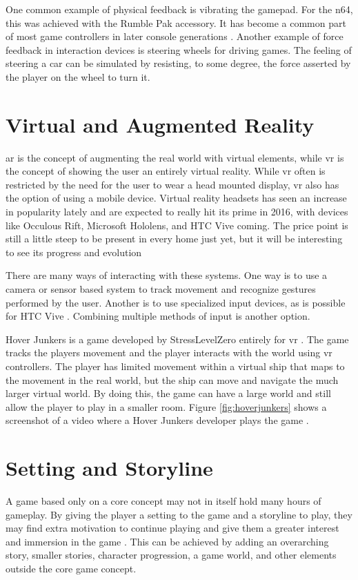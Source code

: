 One common example of physical feedback is vibrating the gamepad.
For the \gls{n64}, this was achieved with the Rumble Pak accessory.
It has become a common part of most game controllers in later console generations \cite{cummings2007evolution}.
Another example of force feedback in interaction devices is steering wheels for driving games.
The feeling of steering a car can be simulated by resisting, to some degree, the force asserted by the player on the wheel to turn it.


\section{Virtual and Augmented Reality}
\label{immersionARVR}
\gls{ar} is the concept of augmenting the real world with virtual elements, while \gls{vr} is the concept of showing the user an entirely virtual reality.
While \gls{vr} often is restricted by the need for the user to wear a head mounted display, \gls{vr} also has the option of using a mobile device. Virtual reality headsets has seen an increase in popularity lately and are expected to really hit its prime in 2016, with devices like Occulous Rift, Microsoft Hololens, and HTC Vive coming. The price point is still a little steep to be present in every home just yet, but it will be interesting to see its progress and evolution \cite{plasencia2015one}

There are many ways of interacting with these systems.
One way is to use a camera or sensor based system to track movement and recognize gestures performed by the user.
Another is to use specialized input devices, as is possible for HTC Vive \cite{htcvive}.
Combining multiple methods of input is another option.

Hover Junkers is a game developed by StressLevelZero entirely for \gls{vr} \cite{hoverjunkers}.
The game tracks the players movement and the player interacts with the world using \gls{vr} controllers.
The player has limited movement within a virtual ship that maps to the movement in the real world, but the ship can move and navigate the much larger virtual world.
By doing this, the game can have a large world and still allow the player to play in a smaller room.
Figure \ref{fig:hoverjunkers} shows a screenshot of a video where a Hover Junkers developer plays the game \cite{hoverVideo}.

\section{Setting and Storyline}
\label{immersionStoryline}
A game based only on a core concept may not in itself hold many hours of gameplay.
By giving the player a setting to the game and a storyline to play, they may find extra motivation to continue playing and give them a greater interest and immersion in the game \cite{overmars2012}.
This can be achieved by adding an overarching story, smaller stories, character progression, a game world, and other elements outside the core game concept.

